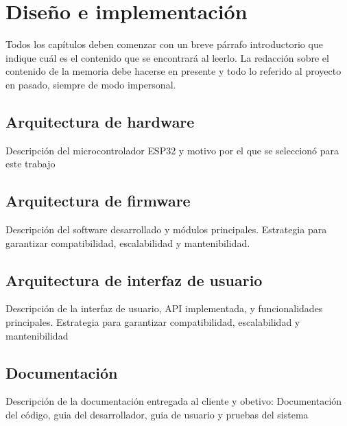 \chapter{Diseño e implementación} %

\label{Chapter3} %

Todos los capítulos deben comenzar con un breve párrafo introductorio que indique cuál es el contenido que se encontrará al leerlo.  La redacción sobre el contenido de la memoria debe hacerse en presente y todo lo referido al proyecto en pasado, siempre de modo impersonal.


\section{Arquitectura de hardware}
Descripción del microcontrolador ESP32 y motivo por el que se seleccionó para este trabajo
\section{Arquitectura de firmware}
Descripción del software desarrollado y módulos principales. Estrategia para garantizar compatibilidad, escalabilidad y mantenibilidad.
\section{Arquitectura de interfaz de usuario}
Descripción de la interfaz de usuario, API implementada, y funcionalidades principales. Estrategia para garantizar compatibilidad, escalabilidad y mantenibilidad
\section{Documentación}
Descripción de la documentación entregada al cliente y obetivo: Documentación del código, guia del desarrollador, guia de usuario y pruebas del sistema



